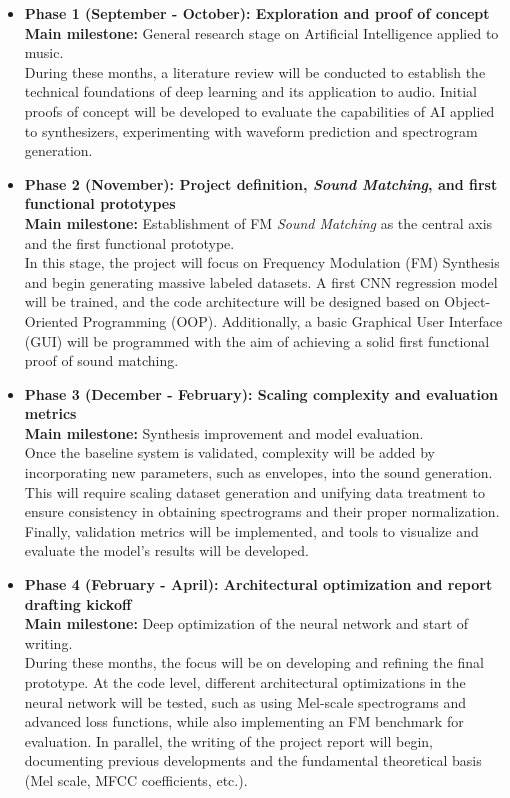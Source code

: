 \begin{itemize}
    \item \textbf{Phase 1 (September - October): Exploration and proof of concept} \\
    \textbf{Main milestone:} General research stage on Artificial Intelligence applied to music. \\
    During these months, a literature review will be conducted to establish the technical foundations of deep learning and its application to audio. Initial proofs of concept will be developed to evaluate the capabilities of AI applied to synthesizers, experimenting with waveform prediction and spectrogram generation.

    \item \textbf{Phase 2 (November): Project definition, \textit{Sound Matching}, and first functional prototypes} \\
    \textbf{Main milestone:} Establishment of FM \textit{Sound Matching} as the central axis and the first functional prototype. \\
    In this stage, the project will focus on Frequency Modulation (FM) Synthesis and begin generating massive labeled datasets. A first CNN regression model will be trained, and the code architecture will be designed based on Object-Oriented Programming (OOP). Additionally, a basic Graphical User Interface (GUI) will be programmed with the aim of achieving a solid first functional proof of sound matching.

    \item \textbf{Phase 3 (December - February): Scaling complexity and evaluation metrics} \\
    \textbf{Main milestone:} Synthesis improvement and model evaluation. \\
    Once the baseline system is validated, complexity will be added by incorporating new parameters, such as envelopes, into the sound generation. This will require scaling dataset generation and unifying data treatment to ensure consistency in obtaining spectrograms and their proper normalization. Finally, validation metrics will be implemented, and tools to visualize and evaluate the model's results will be developed.

    \item \textbf{Phase 4 (February - April): Architectural optimization and report drafting kickoff} \\
    \textbf{Main milestone:} Deep optimization of the neural network and start of writing. \\
    During these months, the focus will be on developing and refining the final prototype. At the code level, different architectural optimizations in the neural network will be tested, such as using Mel-scale spectrograms and advanced loss functions, while also implementing an FM benchmark for evaluation. In parallel, the writing of the project report will begin, documenting previous developments and the fundamental theoretical basis (Mel scale, MFCC coefficients, etc.).


\end{itemize}
